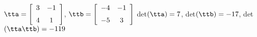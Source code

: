 {$\tta = \left[ \begin {array}{cc} 3&-1\\\noalign{\medskip}4&1\end {array}
 \right]$, 
 \quad
$\ttb = \left[ \begin {array}{cc} -4&-1\\\noalign{\medskip}-5&3\end {array}
 \right]$}
{det$(\tta)=7$, det$(\ttb)=-17$, det$(\tta\ttb)=-119$}






  

